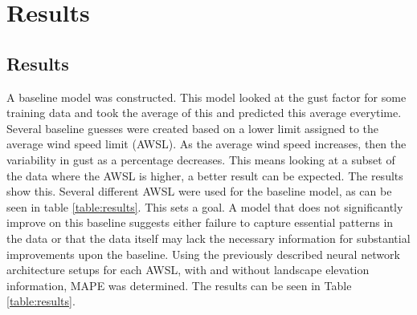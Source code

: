 \chapter{Results}
\label{Chapter5}
\section{Results}
A baseline model was constructed. This model looked at the gust factor for some training data and took the average of this and predicted this average everytime. Several baseline guesses were created based on a lower limit assigned to the average wind speed limit (AWSL). As the average wind speed increases, then the variability in gust as a percentage decreases\cite{mean_gust_HA_HO}. This means looking at a subset of the data where the AWSL is higher, a better result can be expected. The results show this. Several different AWSL were used for the baseline model, as can be seen in table \ref{table:results}. This sets a goal. A model that does not significantly improve on this baseline suggests either failure to capture essential patterns in the data or that the data itself may lack the necessary information for substantial improvements upon the baseline. Using the previously described neural network architecture setups for each AWSL, with and without landscape elevation information, MAPE was determined. The results can be seen in Table \ref{table:results}.

